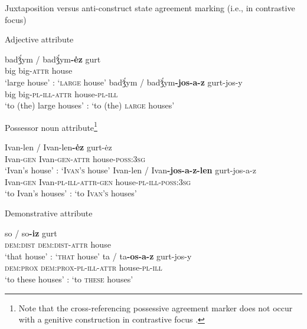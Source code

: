 \begin{exe}
\ex \rm{Juxtaposition versus anti\hyp{}construct state agreement marking (i.e., in contrastive focus) \citep{kelmakov-etal1999,winkler2001}}
\begin{xlist}
\ex	\rm{Adjective attribute}
\begin{xlist}
\ex 	
\gll	badǯ́ym / badǯ́ym\textbf{-ėz} gurt\\
	big {} big-\textsc{attr} house\\
\glt	‘large house’ : ‘\textsc{large} house’
\ex	
\gll	badǯ́ym / badǯ́ym\textbf{-jos-a-z} gurt-jos-y\\
	big {} big-\textsc{pl}-\textsc{ill}-\textsc{attr} house-\textsc{pl}-\textsc{ill}\\
\glt	‘to (the) large houses’ : ‘to (the) \textsc{large} houses’
\end{xlist}
\ex	\rm{Possessor noun attribute}\footnote{Note that the cross-referencing possessive agreement marker does not occur with a genitive construction in contrastive focus \citep[81]{kelmakov-etal1999}.}
\begin{xlist}
\ex	
\gll	Ivan-len / Ivan-len\textbf{-ėz} gurt-ėz\\
	Ivan-\textsc{gen} {} Ivan-\textsc{gen}-\textsc{attr} house-\textsc{poss:3sg}\\
\glt	‘Ivan's house’ : ‘\textsc{Ivan's} house’
\ex	
\gll	Ivan-len / Ivan\textbf{-jos-a-z-len} gurt-jos-a-z\\
	Ivan-\textsc{gen} {} Ivan-\textsc{pl}-\textsc{ill}-\textsc{attr}-\textsc{gen} house-\textsc{pl}-\textsc{ill}-\textsc{poss:3sg}\\
\glt	‘to Ivan's houses’ : ‘to \textsc{Ivan's} houses’
\end{xlist}
\ex	\rm{Demonstrative attribute} \label{udmurt det dem}
\begin{xlist}
\ex	
\gll	so / so\textbf{-iz} gurt\\
 	\textsc{dem:dist} {} \textsc{dem:dist}-\textsc{attr} house\\
\glt	‘that house’ : ‘\textsc{that} house’
\ex 	
\gll	ta / ta\textbf{-os-a-z} gurt-jos-y\\
	\textsc{dem:prox} {} \textsc{dem:prox}-\textsc{pl}-\textsc{ill}-\textsc{attr} house-\textsc{pl}-\textsc{ill}\\
\glt	 ‘to these houses’ : ‘to \textsc{these} houses’
\end{xlist}
\end{xlist}
\end{exe}
